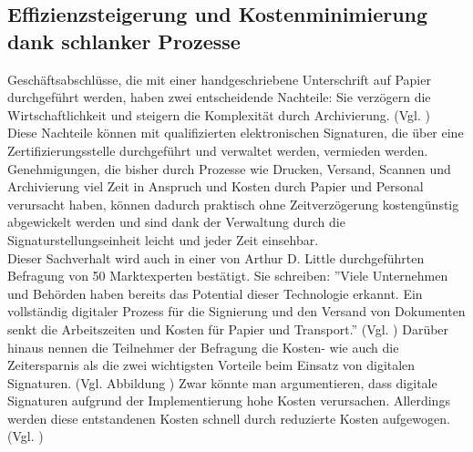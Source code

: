 \documentclass[deutsch]{lib/llncs/llncs}
\begin{document}
\subsection{Effizienzsteigerung und Kostenminimierung dank schlanker Prozesse}
Geschäftsabschlüsse, die mit einer handgeschriebene Unterschrift auf Papier durchgeführt werden, haben zwei entscheidende Nachteile: Sie verzögern die Wirtschaftlichkeit und steigern die Komplexität durch Archivierung. (Vgl. \cite[S. 3]{arthurdlittle2015digitale})\\
Diese Nachteile können mit qualifizierten elektronischen Signaturen, die über eine Zertifizierungsstelle durchgeführt und verwaltet werden, vermieden werden. Genehmigungen, die bisher durch Prozesse wie Drucken, Versand, Scannen und Archivierung viel Zeit in Anspruch und Kosten durch Papier und Personal verursacht haben, können dadurch praktisch ohne Zeitverzögerung kostengünstig abgewickelt werden und sind dank der Verwaltung durch die Signaturstellungseinheit leicht und jeder Zeit einsehbar. \\
Dieser Sachverhalt wird auch in einer von Arthur D. Little durchgeführten Befragung von 50 Marktexperten bestätigt. Sie schreiben: ''Viele Unternehmen und Behörden haben bereits das Potential dieser Technologie erkannt. Ein vollständig digitaler Prozess für die Signierung und den Versand von Dokumenten senkt die Arbeitszeiten und Kosten für Papier und Transport.'' (Vgl. \cite[S. 7]{arthurdlittle2015digitale})
Darüber hinaus nennen die Teilnehmer der Befragung die Kosten- wie auch die Zeitersparnis als die zwei wichtigsten Vorteile beim Einsatz von digitalen Signaturen. (Vgl. Abbildung \cite[S. 7]{arthurdlittle2015digitale})
Zwar könnte man argumentieren, dass digitale Signaturen aufgrund der Implementierung hohe Kosten verursachen. Allerdings werden diese entstandenen Kosten schnell durch reduzierte Kosten aufgewogen. (Vgl. \cite[S. 7]{arthurdlittle2015digitale})
\end{document}
